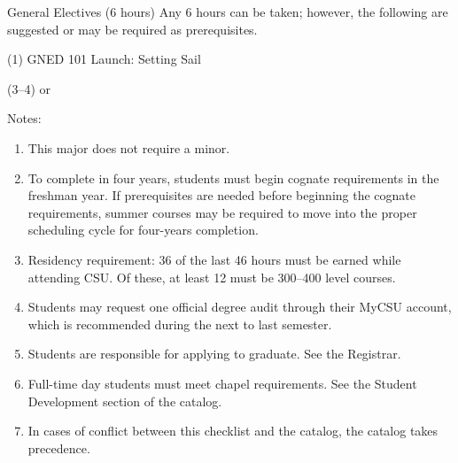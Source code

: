 \begin{reqgroup}{General Electives (6 hours)}
Any 6 hours can be taken; however, the following are suggested or may be required as prerequisites.
\begin{checklist}
\begin{minipage}[t]{\linewidth}
	\item (1)	GNED 101	Launch: Setting Sail
	\item (3--4)	 or %
		\blankReq{}
\end{minipage}
\end{checklist}
\end{reqgroup}

Notes:%
\begin{enumerate}\footnotesize
	\item This major does not require a minor.
	\item To complete in four years, students must begin cognate requirements in the freshman year. If prerequisites are needed before beginning the cognate requirements, summer courses may be required to move into the proper scheduling cycle for four-years completion.
	\item Residency requirement: 36 of the last 46 hours must be earned while attending CSU\@. Of these, at least 12 must be 300--400 level courses.
	\item Students may request one official degree audit through their MyCSU account, which is recommended during the next to last semester.
	\item Students are responsible for applying to graduate. See the Registrar.
	\item Full-time day students must meet chapel requirements. See the Student Development section of the catalog.
	\item In cases of conflict between this checklist and the catalog, the catalog takes precedence.
\end{enumerate}